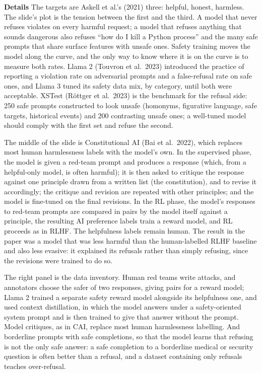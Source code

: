\documentclass[11pt,letterpaper]{article}
\newcommand{\para}[1]{\medskip\noindent\textbf{#1}\quad}
\begin{document}
\para{Details} The targets are Askell et al.'s (2021) three: helpful, honest, harmless. The slide's plot is the tension between the first and the third. A model that never refuses violates on every harmful request; a model that refuses anything that sounds dangerous also refuses ``how do I kill a Python process'' and the many safe prompts that share surface features with unsafe ones. Safety training moves the model along the curve, and the only way to know where it is on the curve is to measure both rates. Llama 2 (Touvron et al.\ 2023) introduced the practice of reporting a violation rate on adversarial prompts and a false-refusal rate on safe ones, and Llama 3 tuned its safety data mix, by category, until both were acceptable. XSTest (Röttger et al.\ 2023) is the benchmark for the refusal side: 250 safe prompts constructed to look unsafe (homonyms, figurative language, safe targets, historical events) and 200 contrasting unsafe ones; a well-tuned model should comply with the first set and refuse the second.

The middle of the slide is Constitutional AI (Bai et al.\ 2022), which replaces most human harmlessness labels with the model's own. In the supervised phase, the model is given a red-team prompt and produces a response (which, from a helpful-only model, is often harmful); it is then asked to critique the response against one principle drawn from a written list (the constitution), and to revise it accordingly; the critique and revision are repeated with other principles; and the model is fine-tuned on the final revisions. In the RL phase, the model's responses to red-team prompts are compared in pairs by the model itself against a principle, the resulting AI preference labels train a reward model, and RL proceeds as in RLHF. The helpfulness labels remain human. The result in the paper was a model that was less harmful than the human-labelled RLHF baseline and also less evasive: it explained its refusals rather than simply refusing, since the revisions were trained to do so.

The right panel is the data inventory. Human red teams write attacks, and annotators choose the safer of two responses, giving pairs for a reward model; Llama 2 trained a separate safety reward model alongside its helpfulness one, and used context distillation, in which the model answers under a safety-oriented system prompt and is then trained to give that answer without the prompt. Model critiques, as in CAI, replace most human harmlessness labelling. And borderline prompts with safe completions, so that the model learns that refusing is not the only safe answer: a safe completion to a borderline medical or security question is often better than a refusal, and a dataset containing only refusals teaches over-refusal.
\end{document}
